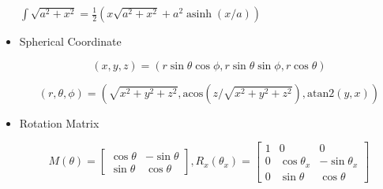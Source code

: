 \begin{itemize}
{  \(
    \displaystyle
    \int \sqrt{a^2 + x^2} = \frac{1}{2} \left(x\sqrt{a^2+x^2} + a^2 \operatorname{asinh}(x/a) \right)
  \)
}

\item Spherical Coordinate

$$
(x, y, z) = (r\sin\theta\cos\phi, r\sin\theta\sin\phi, r\cos\theta) 
$$

$$
(r, \theta, \phi) = (\sqrt{x^2+y^2+z^2}, \textrm{acos}(z/\sqrt{x^2+y^2+z^2}), \textrm{atan2}(y,x)) 
$$

\item Rotation Matrix

$$
M(\theta)=
\begin{bmatrix}
\cos\theta & -\sin\theta\\
\sin\theta & \cos\theta
\end{bmatrix},
R_x(\theta_x)=
\begin{bmatrix}
1 & 0 & 0\\
0 & \cos\theta_x & -\sin\theta_x \\
0 & \sin\theta & \cos\theta
\end{bmatrix}
$$

\end{itemize}

